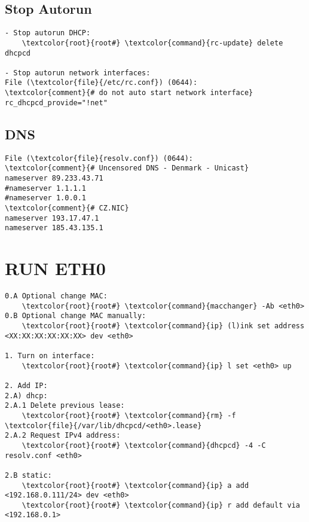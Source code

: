 \documentclass[10pt, a4paper, onecolumn, openany]{book}         %
\begin{document}
\subsection{Stop Autorun}
\begin{Verbatim}[commandchars=\\\{\}]
- Stop autorun DHCP:
    \textcolor{root}{root#} \textcolor{command}{rc-update} delete dhcpcd

- Stop autorun network interfaces:
File (\textcolor{file}{/etc/rc.conf}) (0644):
\textcolor{comment}{# do not auto start network interface}
rc_dhcpcd_provide="!net"
\end{Verbatim}

\subsection{DNS}
\begin{Verbatim}[commandchars=\\\{\}]
File (\textcolor{file}{resolv.conf}) (0644):
\textcolor{comment}{# Uncensored DNS - Denmark - Unicast}
nameserver 89.233.43.71
#nameserver 1.1.1.1
#nameserver 1.0.0.1
\textcolor{comment}{# CZ.NIC}
nameserver 193.17.47.1
nameserver 185.43.135.1
\end{Verbatim}

\section{RUN ETH0}
\begin{Verbatim}[commandchars=\\\{\}]
0.A Optional change MAC:
    \textcolor{root}{root#} \textcolor{command}{macchanger} -Ab <eth0>
0.B Optional change MAC manually:
    \textcolor{root}{root#} \textcolor{command}{ip} (l)ink set address <XX:XX:XX:XX:XX:XX> dev <eth0>
    
1. Turn on interface:
    \textcolor{root}{root#} \textcolor{command}{ip} l set <eth0> up

2. Add IP:
2.A) dhcp:
2.A.1 Delete previous lease:
    \textcolor{root}{root#} \textcolor{command}{rm} -f \textcolor{file}{/var/lib/dhcpcd/<eth0>.lease}
2.A.2 Request IPv4 address:
    \textcolor{root}{root#} \textcolor{command}{dhcpcd} -4 -C resolv.conf <eth0>

2.B static:
    \textcolor{root}{root#} \textcolor{command}{ip} a add <192.168.0.111/24> dev <eth0>
    \textcolor{root}{root#} \textcolor{command}{ip} r add default via <192.168.0.1>
\end{Verbatim}
\end{document}
